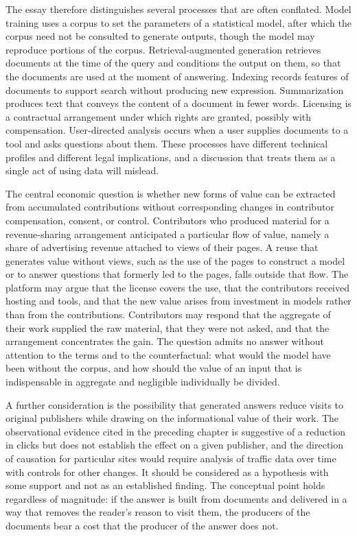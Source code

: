\documentclass[11pt]{article}
\theoremstyle{remark}
\begin{document}
The essay therefore distinguishes several processes that are often conflated. Model training uses a corpus to set the parameters of a statistical model, after which the corpus need not be consulted to generate outputs, though the model may reproduce portions of the corpus. Retrieval-augmented generation retrieves documents at the time of the query and conditions the output on them, so that the documents are used at the moment of answering. Indexing records features of documents to support search without producing new expression. Summarization produces text that conveys the content of a document in fewer words. Licensing is a contractual arrangement under which rights are granted, possibly with compensation. User-directed analysis occurs when a user supplies documents to a tool and asks questions about them. These processes have different technical profiles and different legal implications, and a discussion that treats them as a single act of using data will mislead.

The central economic question is whether new forms of value can be extracted from accumulated contributions without corresponding changes in contributor compensation, consent, or control. Contributors who produced material for a revenue-sharing arrangement anticipated a particular flow of value, namely a share of advertising revenue attached to views of their pages. A reuse that generates value without views, such as the use of the pages to construct a model or to answer questions that formerly led to the pages, falls outside that flow. The platform may argue that the license covers the use, that the contributors received hosting and tools, and that the new value arises from investment in models rather than from the contributions. Contributors may respond that the aggregate of their work supplied the raw material, that they were not asked, and that the arrangement concentrates the gain. The question admits no answer without attention to the terms and to the counterfactual: what would the model have been without the corpus, and how should the value of an input that is indispensable in aggregate and negligible individually be divided.

A further consideration is the possibility that generated answers reduce visits to original publishers while drawing on the informational value of their work. The observational evidence cited in the preceding chapter is suggestive of a reduction in clicks but does not establish the effect on a given publisher, and the direction of causation for particular sites would require analysis of traffic data over time with controls for other changes. It should be considered as a hypothesis with some support and not as an established finding. The conceptual point holds regardless of magnitude: if the answer is built from documents and delivered in a way that removes the reader's reason to visit them, the producers of the documents bear a cost that the producer of the answer does not.
\end{document}
